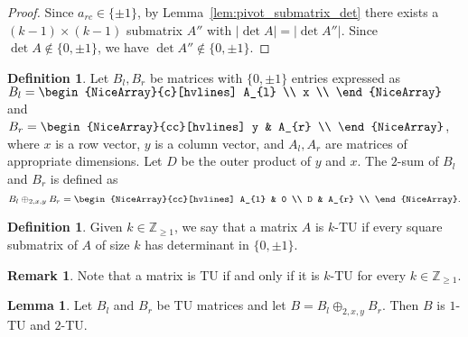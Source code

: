 \documentclass{article}
\theoremstyle{definition}
\newtheorem{lemma}[theorem]{Lemma}
\newtheorem{definition}[theorem]{Definition}
\newtheorem{remark}[theorem]{Remark}
\begin{document}
\begin{proof}
    Since $a_{rc} \in \{\pm 1\}$, by Lemma~\ref{lem:pivot_submatrix_det} there exists a $(k - 1) \times (k - 1)$ submatrix $A''$ with $|\det A| = |\det A''|$. Since $\det A \notin \{0, \pm 1\}$, we have $\det A'' \notin \{0, \pm 1\}$.
\end{proof}

\begin{definition}\label{def:two_sum}
    Let $B_{l}, B_{r}$ be matrices with $\{0, \pm 1\}$ entries expressed as $B_{l} = \begin{NiceArray}{c}[hvlines] A_{l} \\ x \\ \end{NiceArray}$ and $B_{r} = \begin{NiceArray}{cc}[hvlines] y & A_{r} \\ \end{NiceArray}$, where $x$ is a row vector, $y$ is a column vector, and $A_{l}, A_{r}$ are matrices of appropriate dimensions. Let $D$ be the outer product of $y$ and $x$. The $2$-sum of $B_{l}$ and $B_{r}$ is defined as
    \[
        B_{l} \oplus_{2, x, y} B_{r} = \begin{NiceArray}{cc}[hvlines] A_{l} & 0 \\ D & A_{r} \\ \end{NiceArray}.
    \]
\end{definition}

\begin{definition}\label{def:k_tu}
    Given $k \in \mathbb{Z}_{\geq 1}$, we say that a matrix $A$ is $k$-TU if every square submatrix of $A$ of size $k$ has determinant in $\{0, \pm 1\}$.
\end{definition}

\begin{remark}
    Note that a matrix is TU if and only if it is $k$-TU for every $k \in \mathbb{Z}_{\geq 1}$.
\end{remark}

\begin{lemma}\label{lem:two_sum_1_2_tu}
    Let $B_{l}$ and $B_{r}$ be TU matrices and let $B = B_{l} \oplus_{2, x, y} B_{r}$. Then $B$ is $1$-TU and $2$-TU.
\end{lemma}
\end{document}
